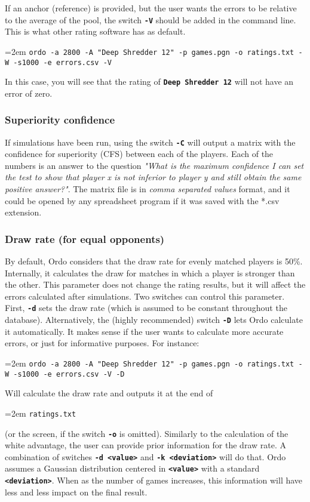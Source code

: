 \documentclass[12pt]{article}
\newcommand{\swtch} [1] {\texttt{\textbf{#1}}}
\newcommand{\cmdln}[1]{
	\par
	\begingroup
		\leftskip=2em
		\addtolength{\rightskip}{0em}
		\noindent \small{\texttt{#1}}
		\par
	\endgroup
}
\begin{document}
If an anchor (reference) is provided, but the user wants the errors to be relative to the average of the pool, the switch \swtch{-V} should be added in the command line. This is what other rating software has as default.

\cmdln{ordo -a 2800 -A "Deep Shredder 12" -p games.pgn -o ratings.txt -W -s1000 -e errors.csv -V}

In this case, you will see that the rating of \swtch{Deep Shredder 12} will not have an error of zero.

\subsubsection*{Superiority confidence}

If simulations have been run, using the switch \swtch{-C} will output a matrix with the confidence for superiority (CFS) between each of the players.
Each of the numbers is an answer to the question \textit{"What is the maximum confidence I can set the test to show that player x is not inferior to player y and still obtain the same positive answer?"}.
The matrix file is in \textit{comma separated values} format, and it could be opened by any spreadsheet program if it was saved with the *.csv extension.

\subsubsection*{Draw rate (for equal opponents)}
By default, Ordo considers that the draw rate for evenly matched players is 50\%.
Internally, it calculates the draw for matches in which a player is stronger than the other.
This parameter does not change the rating results, but it will affect the errors calculated after simulations.
Two switches can control this parameter. 
First, \swtch{-d} sets the draw rate (which is assumed to be constant throughout the database). 
Alternatively, the (highly recommended) switch \swtch{-D} lets Ordo calculate it automatically. 
It makes sense if the user wants to calculate more accurate errors, or just for informative purposes.
For instance:

\cmdln{ordo -a 2800 -A "Deep Shredder 12" -p games.pgn -o ratings.txt -W -s1000 -e errors.csv -V -D}

Will calculate the draw rate and outputs it at the end of \cmdln{ratings.txt} (or the screen, if the switch \swtch{-o} is omitted). 
Similarly to the calculation of the white advantage, the user can provide prior information for the draw rate.
A combination of switches \swtch{-d <value>} and \swtch{-k <deviation>} will do that.
Ordo assumes a Gaussian distribution centered in \swtch{<value>} with a standard \swtch{<deviation>}.
When as the number of games increases, this information will have less and less impact on the final result.
\end{document}
